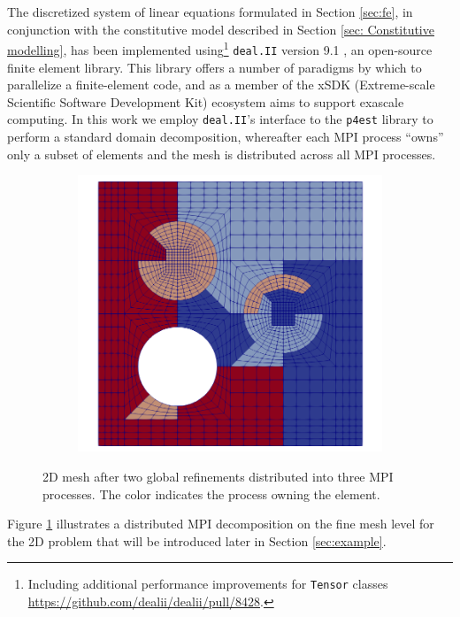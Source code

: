 \documentclass[AMA,STIX1COL]{WileyNJD-v2}
\begin{document}
The discretized system of linear equations formulated in Section \ref{sec:fe}, in conjunction with the constitutive model described in
Section \ref{sec: Constitutive modelling}, has been implemented using\footnote{Including additional performance improvements for \texttt{Tensor} classes \url{https://github.com/dealii/dealii/pull/8428}.} \texttt{deal.II} version 9.1 \cite{dealII91}, an open-source finite element library.
This library offers a number of paradigms by which to parallelize a finite-element code, and as a member of the
xSDK (Extreme-scale Scientific Software Development Kit) ecosystem \citep{Bartlett2017b} aims to support exascale computing.
In this work we employ \texttt{deal.II}'s interface to the \texttt{p4est} \cite{p4est} library to perform a standard domain decomposition,
whereafter each MPI process ``owns'' only a subset of elements and the mesh is distributed across all MPI processes.
%
\begin{figure}[!ht]
  \centering
  \begin{subfigure}[b]{0.4\textwidth}
    \centering
    \includegraphics[width=\textwidth]{fine_level_2d.png}
  \end{subfigure}
  \caption{2D mesh after two global refinements distributed into three MPI processes. The color indicates the process owning the element.}%
  \label{fig:miehe_fine_level}
\end{figure}
%
%
Figure \ref{fig:miehe_fine_level} illustrates a distributed MPI decomposition on the fine mesh level for the 2D problem that will be introduced later in Section \ref{sec:example}.
\end{document}
